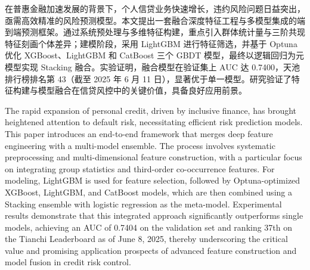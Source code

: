 \documentclass{thuemp}
\begin{document}





\maketitle

\begin{empAbstract}
在普惠金融加速发展的背景下，个人信贷业务快速增长，违约风险问题日益突出，亟需高效精准的风险预测模型。本文提出一套融合深度特征工程与多模型集成的端到端预测框架。通过系统预处理与多维特征构建，重点引入群体统计量与三阶共现特征刻画个体差异；建模阶段，采用 LightGBM 进行特征筛选，并基于 Optuna 优化 XGBoost、LightGBM 和 CatBoost 三个 GBDT 模型，最终以逻辑回归为元模型实现 Stacking 融合。实验证明，融合模型在验证集上 AUC 达 0.7400，天池排行榜排名第 43（截至 2025 年 6 月 11 日），显著优于单一模型。研究验证了特征构建与模型融合在信贷风控中的关键价值，具备良好应用前景。 
\end{empAbstract}


\begin{empAbstractEn}
The rapid expansion of personal credit, driven by inclusive finance, has brought heightened attention to default risk, necessitating efficient risk prediction models. This paper introduces an end-to-end framework that merges deep feature engineering with a multi-model ensemble. The process involves systematic preprocessing and multi-dimensional feature construction, with a particular focus on integrating group statistics and third-order co-occurrence features. For modeling, LightGBM is used for feature selection, followed by Optuna-optimized XGBoost, LightGBM, and CatBoost models, which are then combined using a Stacking ensemble with logistic regression as the meta-model. Experimental results demonstrate that this integrated approach significantly outperforms single models, achieving an AUC of 0.7404 on the validation set and ranking 37th on the Tianchi Leaderboard as of June 8, 2025, thereby underscoring the critical value and promising application prospects of advanced feature construction and model fusion in credit risk control.

\end{empAbstractEn}
\end{document}

